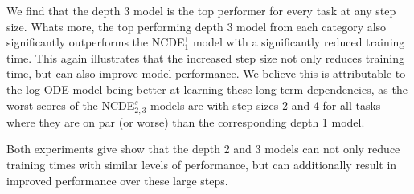 

We find that the depth $3$ model is the top performer for every task at any step size. Whats more, the top performing depth 3 model from each category also significantly outperforms the NCDE$^1_1$ model with a significantly reduced training time. This again illustrates that the increased step size not only reduces training time, but can also improve model performance. We believe this is attributable to the log-ODE model being better at learning these long-term dependencies, as the worst scores of the NCDE$^s_{2, 3}$ models are with step sizes 2 and 4 for all tasks where they are on par (or worse) than the corresponding depth 1 model.

Both experiments give show that the depth 2 and 3 models can not only reduce training times with similar levels of performance, but can additionally result in improved performance over these large steps. 
